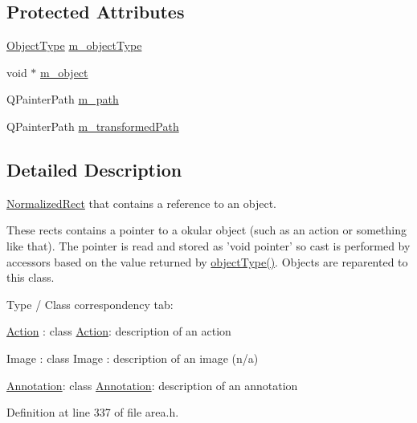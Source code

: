 \subsection*{Protected Attributes}
\begin{DoxyCompactItemize}
\item 
\hyperlink{classOkular_1_1ObjectRect_a2f77f7653306bae90bfb68277aaafe16}{Object\+Type} \hyperlink{classOkular_1_1ObjectRect_a2ba33c1a9406f232e21870a264e2ac7b}{m\+\_\+object\+Type}
\item 
void $\ast$ \hyperlink{classOkular_1_1ObjectRect_a8adcb135543e1399458f1fc3392f7a84}{m\+\_\+object}
\item 
Q\+Painter\+Path \hyperlink{classOkular_1_1ObjectRect_a92f00ded61bc665991952b8d66d415eb}{m\+\_\+path}
\item 
Q\+Painter\+Path \hyperlink{classOkular_1_1ObjectRect_a2df8a0dd35a6097de4058b68fd5b8dad}{m\+\_\+transformed\+Path}
\end{DoxyCompactItemize}


\subsection{Detailed Description}
\hyperlink{classOkular_1_1NormalizedRect}{Normalized\+Rect} that contains a reference to an object. 

These rects contains a pointer to a okular object (such as an action or something like that). The pointer is read and stored as 'void pointer' so cast is performed by accessors based on the value returned by \hyperlink{classOkular_1_1ObjectRect_a1c61e4737530a2c15ad93c8764917a14}{object\+Type()}. Objects are reparented to this class.

Type / Class correspondency tab\+:
\begin{DoxyItemize}
\item \hyperlink{classOkular_1_1Action}{Action} \+: class \hyperlink{classOkular_1_1Action}{Action}\+: description of an action
\item Image \+: class Image \+: description of an image (n/a)
\item \hyperlink{classOkular_1_1Annotation}{Annotation}\+: class \hyperlink{classOkular_1_1Annotation}{Annotation}\+: description of an annotation 
\end{DoxyItemize}

Definition at line 337 of file area.\+h.



